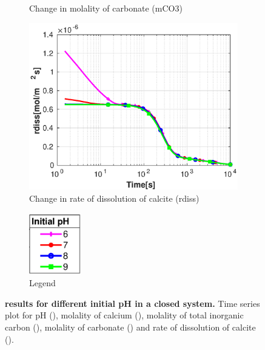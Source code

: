 \begin{figure}[!h]
\begin{subfigure}{.5\linewidth}
        \caption{\small Change in molality of carbonate (mCO3)}
        \label{fig:withoutpHmCO3}
    \end{subfigure}%
    \hfill
    \begin{subfigure}{.5\linewidth}
            \centering
        \includegraphics[width=\textwidth]{PICTURES/without_pH_rdiss.eps}
        \caption{\small Change in rate of dissolution of calcite (rdiss)}
        \label{fig:withoutpHrdiss}
    \end{subfigure}%
  \hfill
  \begin{subfigure}{.5\linewidth}
            \centering
        \includegraphics[width=0.25\textwidth]{PICTURES/with_pH_legend.eps}
        \caption{\small Legend}
        \label{fig:withoutpHlegend}
    \end{subfigure}%
    \caption [\DuMuX results for different initial pH in a closed system.] {\textbf{\DuMuX results for different initial pH in a closed system.} \small Time series plot for pH (), 
    molality of calcium (), 
    molality of total inorganic carbon (), molality of carbonate () 
    and rate of dissolution of calcite ().}
    
    \label{fig:comparisionWithoutDiffInitialpH}
\end{figure}

